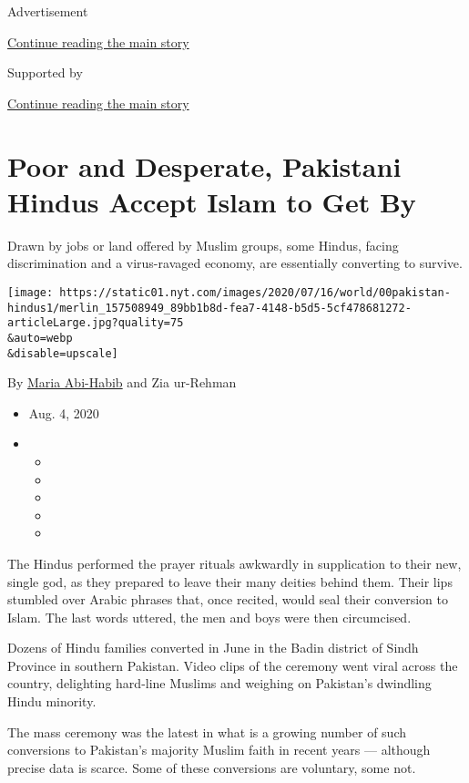 Advertisement

\protect\hyperlink{after-top}{Continue reading the main story}

Supported by

\protect\hyperlink{after-sponsor}{Continue reading the main story}

\hypertarget{poor-and-desperate-pakistani-hindus-accept-islam-to-get-by}{%
\section{Poor and Desperate, Pakistani Hindus Accept Islam to Get
By}\label{poor-and-desperate-pakistani-hindus-accept-islam-to-get-by}}

Drawn by jobs or land offered by Muslim groups, some Hindus, facing
discrimination and a virus-ravaged economy, are essentially converting
to survive.

\texttt{[image: https://static01.nyt.com/images/2020/07/16/world/00pakistan-hindus1/merlin\_157508949\_89bb1b8d-fea7-4148-b5d5-5cf478681272-articleLarge.jpg?quality=75\\\&auto=webp\\\&disable=upscale]}

By \href{https://www.nytimes.com/by/maria-abi-habib}{Maria Abi-Habib}
and Zia ur-Rehman

\begin{itemize}
\item
  Aug. 4, 2020
\item
  \begin{itemize}
  \item
  \item
  \item
  \item
  \item
  \end{itemize}
\end{itemize}

The Hindus performed the prayer rituals awkwardly in supplication to
their new, single god, as they prepared to leave their many deities
behind them. Their lips stumbled over Arabic phrases that, once recited,
would seal their conversion to Islam. The last words uttered, the men
and boys were then circumcised.

Dozens of Hindu families converted in June in the Badin district of
Sindh Province in southern Pakistan. Video clips of the ceremony went
viral across the country, delighting hard-line Muslims and weighing on
Pakistan's dwindling Hindu minority.

The mass ceremony was the latest in what is a growing number of such
conversions to Pakistan's majority Muslim faith in recent years ---
although precise data is scarce. Some of these conversions are
voluntary, some not.


